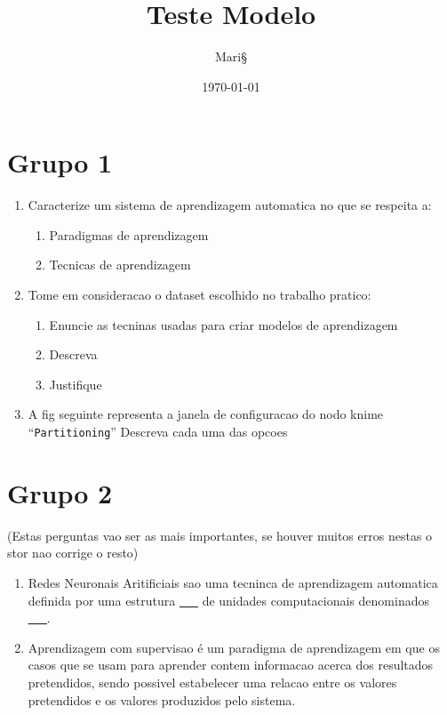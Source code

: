 \documentclass[11pt]{article}
\author{Mari§}
\date{\today}
\title{Teste Modelo}
\begin{document}
\maketitle
\tableofcontents


\section{Grupo 1}
\label{sec:org7b2d154}
\begin{enumerate}
\item Caracterize um sistema de aprendizagem automatica no que se respeita a:
\begin{enumerate}
\item Paradigmas de aprendizagem
\item Tecnicas de aprendizagem
\end{enumerate}

\item Tome em consideracao o dataset escolhido no trabalho pratico:
\begin{enumerate}
\item Enuncie as tecninas usadas para criar modelos de aprendizagem
\item Descreva
\item Justifique
\end{enumerate}

\item A fig seguinte representa a janela de configuracao do nodo knime ``\texttt{Partitioning}''
Descreva cada uma das opcoes
\end{enumerate}

\section{Grupo 2}
\label{sec:org268f76d}

(Estas perguntas vao ser as mais importantes, se houver muitos erros nestas o stor nao corrige o resto)

\begin{enumerate}
\item Redes Neuronais Aritificiais sao uma tecninca de aprendizagem automatica definida por uma estrutura \uline{\uline{\_\_}} de unidades computacionais denominados \uline{\uline{\_\_}}.

\item Aprendizagem com supervisao é um paradigma de aprendizagem em que os casos que  se usam para aprender contem informacao acerca dos resultados pretendidos, sendo possivel estabelecer uma relacao entre os valores pretendidos e os valores produzidos pelo sistema.
\end{enumerate}
\end{document}
